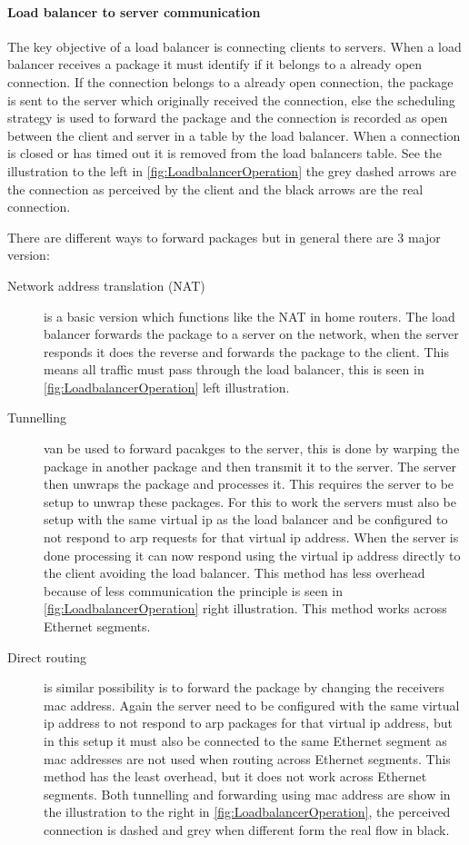 \paragraph{Load balancer to server communication}
The key objective of a load balancer is connecting clients to servers.
When a load balancer receives a package it must identify if it belongs to a already open connection.
If the connection belongs to a already open connection, the package is sent to the server which originally received the connection, else the scheduling strategy is used to forward the package and the connection is recorded as open between the client and server in a table by the load balancer.
When a connection is closed or has timed out it is removed from the load balancers table. See the illustration to the left in \cref{fig:LoadbalancerOperation} the grey dashed arrows are the connection as perceived by the client and the black arrows are the real connection.

There are different ways to forward packages but in general there are 3 major version:
\begin{description}
	\item[Network address translation (NAT)] is a basic version which functions like the NAT in home routers.
	The load balancer forwards the package to a server on the network, when the server responds it does the reverse and forwards the package to the client.
	This means all traffic must pass through the load balancer, this is seen in \cref{fig:LoadbalancerOperation} left illustration. 
	
	\item[Tunnelling] van be used to forward pacakges to the server, this is done by warping the package in another package and then transmit it to the server.
	The server then unwraps the package and processes it. This requires the server to be setup to unwrap these packages.
	For this to work the servers must also be setup with the same virtual ip as the load balancer and be configured to not respond to arp requests for that virtual ip address.
	When the server is done processing it can now respond using the virtual ip address directly to the client avoiding the load balancer.
	This method has less overhead because of less communication the principle is seen in \cref{fig:LoadbalancerOperation} right illustration.
	This method works across Ethernet segments.
	
	\item[Direct routing] is similar possibility is to forward the package by changing the receivers mac address.
	Again the server need to be configured with the same virtual ip address to not respond to arp packages for that virtual ip address, but in this setup it must also be connected to the same Ethernet segment as mac addresses are not used when routing across Ethernet segments.
	This method has the least overhead, but it does not work across Ethernet segments.
	Both tunnelling and forwarding using mac address are show in the illustration to the right in \cref{fig:LoadbalancerOperation}, the perceived connection is dashed and grey when different form the real flow in black.
	
\end{description}


